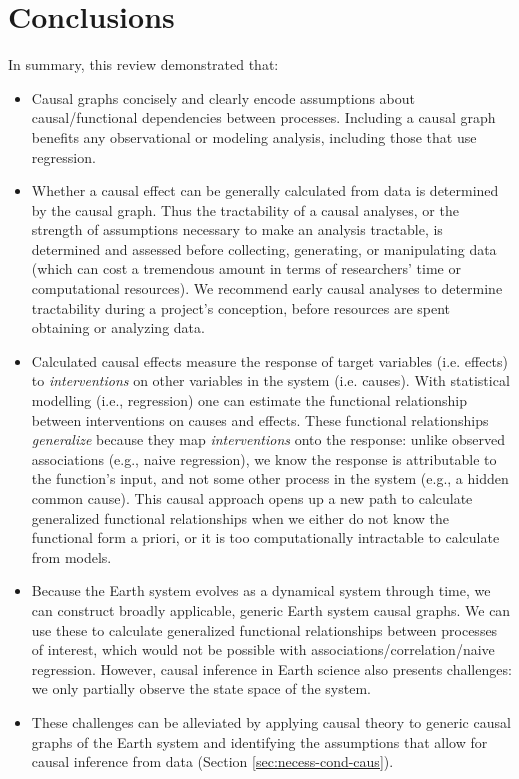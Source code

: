 \documentclass[12pt]{article}
\begin{document}
\section{Conclusions}

In summary, this review demonstrated that:

\begin{itemize}
\item Causal graphs concisely and clearly encode assumptions about
  causal/functional dependencies between processes. Including a causal
  graph benefits any observational or modeling analysis, including
  those that use regression.
\item Whether a causal effect can be generally calculated from data is
  determined by the causal graph. Thus the tractability of a causal
  analyses, or the strength of assumptions necessary to make an
  analysis tractable, is determined and assessed before collecting,
  generating, or manipulating data (which can cost a tremendous amount
  in terms of researchers' time or computational resources). We
  recommend early causal analyses to determine tractability during a
  project's conception, before resources are spent obtaining or
  analyzing data.
\item Calculated causal effects measure the response of target
  variables (i.e. effects) to \textit{interventions} on other
  variables in the system (i.e. causes). With statistical modelling
  (i.e., regression) one can estimate the functional relationship
  between interventions on causes and effects.  These functional
  relationships \textit{generalize} because they map
  \textit{interventions} onto the response: unlike observed
  associations (e.g., naive regression), we know the response is
  attributable to the function's input, and not some other process in
  the system (e.g., a hidden common cause). This causal approach opens
  up a new path to calculate generalized functional relationships when
  we either do not know the functional form a priori, or it is too
  computationally intractable to calculate from models.
\item Because the Earth system evolves as a dynamical system through
  time, we can construct broadly applicable, generic Earth system
  causal graphs. We can use these to calculate generalized functional
  relationships between processes of interest, which would not be
  possible with associations/correlation/naive regression. However,
  causal inference in Earth science also presents challenges: we only
  partially observe the state space of the system.
\item These challenges can be alleviated by applying causal theory to
  generic causal graphs of the Earth system and identifying the
  assumptions that allow for causal inference from data (Section
  \ref{sec:necess-cond-caus}).
\end{itemize}
\end{document}
